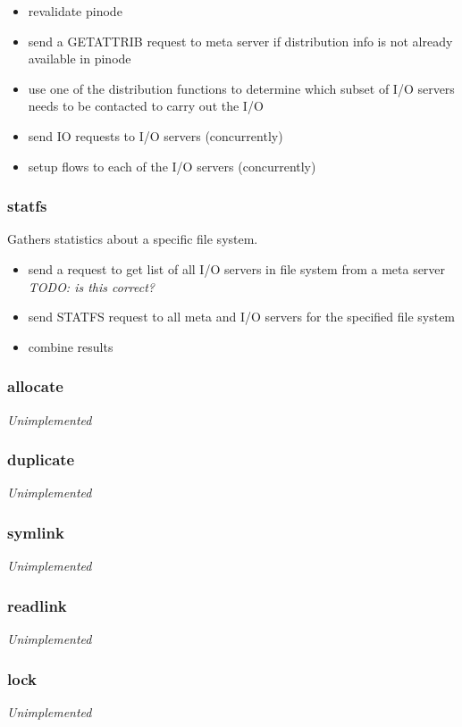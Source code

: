 \documentclass[11pt, letterpaper]{article}
\begin{document}
\begin{itemize}
\item revalidate pinode
\item send a GETATTRIB request to meta server if distribution info is not
already available in pinode
\item use one of the distribution functions to determine which subset of
I/O servers needs to be contacted to carry out the I/O
\item send IO requests to I/O servers (concurrently)
\item setup flows to each of the I/O servers (concurrently)
\end{itemize}

\subsubsection{statfs}

Gathers statistics about a specific file system.

\begin{itemize}
\item send a request to get list of all I/O servers in file system from
a meta server \emph{TODO: is this correct?}
\item send STATFS request to all meta and I/O servers for the specified
file system
\item combine results
\end{itemize}

\subsubsection{allocate}
\emph{Unimplemented}

\subsubsection{duplicate}
\emph{Unimplemented}

\subsubsection{symlink}
\emph{Unimplemented}

\subsubsection{readlink}
\emph{Unimplemented}

\subsubsection{lock}
\emph{Unimplemented}
\end{document}

